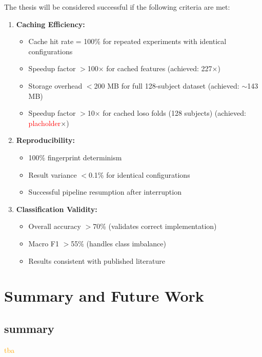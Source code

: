\documentclass{imc-inf} %
\begin{document}
The thesis will be considered successful if the following criteria are met:

\begin{enumerate}
\item \textbf{Caching Efficiency:}
  \begin{itemize}
  \item Cache hit rate = 100\% for repeated experiments with identical configurations
  \item Speedup factor $>$100$\times$ for cached features (achieved: 227$\times$)
  \item Storage overhead $<$200 MB for full 128-subject dataset (achieved: $\sim$143 MB)
    \item Speedup factor $>$10$\times$ for cached loso folds (128 subjects) (achieved: \textcolor{red}{placholder}$\times$)
  \end{itemize}

\item \textbf{Reproducibility:}
  \begin{itemize}
  \item 100\% fingerprint determinism
  \item Result variance $<$0.1\% for identical configurations
  \item Successful pipeline resumption after interruption
  \end{itemize}

\item \textbf{Classification Validity:}
  \begin{itemize}
  \item Overall accuracy $>$70\% (validates correct implementation)
  \item Macro F1 $>$55\% (handles class imbalance)
  \item Results consistent with published literature
  \end{itemize}
\end{enumerate}

\chapter{Summary and Future Work}

\section{summary}
\textcolor{orange}{tba}
\end{document}
